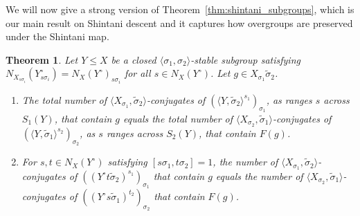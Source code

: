 \documentclass[11pt]{article}
\numberwithin{equation}{section}
\theoremstyle{shdefinition}
\theoremstyle{shplain}
\newtheorem{theorem}[definition]{Theorem}
\newcommand{\s}{\sigma}
\newcommand{\ws}{\widetilde{\sigma}}
\newcommand{\<}{\langle}
\renewcommand{\>}{\rangle}
\renewcommand{\leq}{\leqslant}
\renewcommand{\:}{\colon}
\begin{document}
We will now give a strong version of Theorem~\ref{thm:shintani_subgroups}, which is our main result on Shintani descent and it captures how overgroups are preserved under the Shintani map.

\begin{theorem} \label{thm:shintani_subgroups_strong}
Let $Y \leq X$ be a closed $\<\s_1,\s_2\>$-stable subgroup satisfying $N_{X_{s\s_i}}(Y^\circ_{s\s_i}) = N_X(Y^\circ)_{s\s_i}$ for all $s \in N_X(Y^\circ)$. Let $g \in X_{\s_1}\ws_2$.
\begin{enumerate}
\item The total number of $\<X_{\s_1},\ws_2\>$-conjugates of $(\<Y,\ws_2\>^{s_1})_{\s_1}$, as ranges $s$ across $S_1(Y)$, that contain $g$ equals the total number of $\<X_{\s_2},\ws_1\>$-conjugates of $(\<Y,\ws_1\>^{s_2})_{\s_2}$, as $s$ ranges across $S_2(Y)$, that contain $F(g)$.
\item For $s,t \in N_X(Y^\circ)$ satisfying $[s\s_1,t\s_2]\!=\!1$, the number of $\< X_{\s_1}, \ws_2 \>$-conjugates of $((Y^\circ t\ws_2)^{s_1})_{\s_1}$ that contain $g$ equals the number of $\< X_{\s_2}, \ws_1\>$-conjugates of $((Y^\circ s\ws_1)^{t_2})_{\s_2}$ that contain $F(g)$.
\end{enumerate}
\end{theorem}
\end{document}
